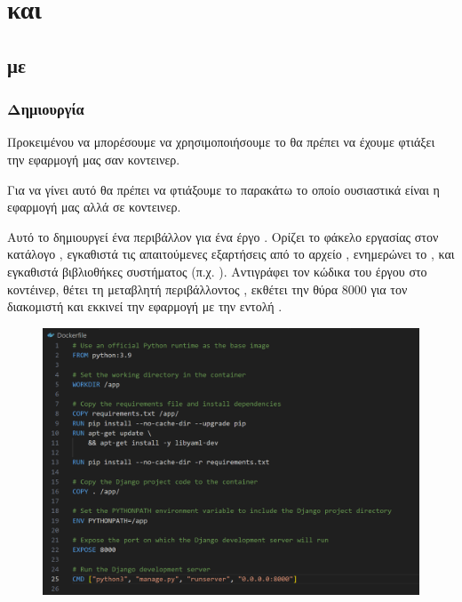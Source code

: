 \chapter{ και  }

\section{ με }

\subsection{Δημιουργία }

Προκειμένου να μπορέσουμε να χρησιμοποιήσουμε το  θα πρέπει να έχουμε φτιάξει την εφαρμογή μας σαν κοντεινερ.

Για να γίνει αυτό θα πρέπει να φτιάξουμε το παρακάτω  το οποίο ουσιαστικά είναι η εφαρμογή μας αλλά σε κοντεινερ. 

Αυτό το  δημιουργεί ένα περιβάλλον  
για ένα έργο . Ορίζει το φάκελο εργασίας στον κατάλογο 
, εγκαθιστά τις απαιτούμενες εξαρτήσεις από το αρχείο 
, ενημερώνει το , και εγκαθιστά βιβλιοθήκες συστήματος 
(π.χ. ). 
Αντιγράφει τον κώδικα του έργου  στο κοντέινερ, 
θέτει τη μεταβλητή περιβάλλοντος , εκθέτει την 
θύρα 8000 για τον διακομιστή  και 
εκκινεί την εφαρμογή με την εντολή .

\begin{figure}[htb]
	\centering
	\includegraphics[width=1.5\textwidth]{graphics/dockerfile.png}
	\caption{}
\end{figure}

